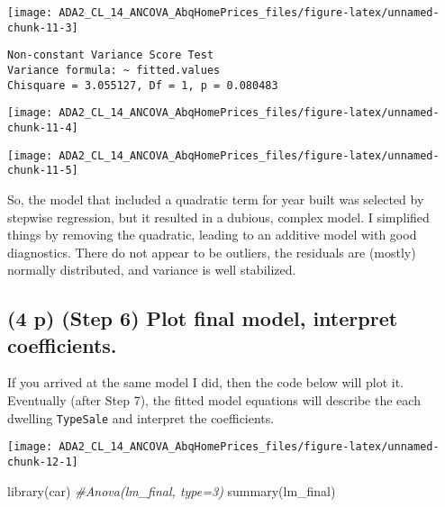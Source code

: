 \documentclass[
  12pt,
]{article}
\newenvironment{Shaded}{\begin{snugshade}}{\end{snugshade}}
\newcommand{\CommentTok}[1]{\textcolor[rgb]{0.56,0.35,0.01}{\textit{#1}}}
\newcommand{\FunctionTok}[1]{\textcolor[rgb]{0.00,0.00,0.00}{#1}}
\newcommand{\NormalTok}[1]{#1}
\begin{document}
\begin{center}\texttt{[image: ADA2\_CL\_14\_ANCOVA\_AbqHomePrices\_files/figure-latex/unnamed-chunk-11-3]} \end{center}

\begin{verbatim}
Non-constant Variance Score Test 
Variance formula: ~ fitted.values 
Chisquare = 3.055127, Df = 1, p = 0.080483
\end{verbatim}

\begin{center}\texttt{[image: ADA2\_CL\_14\_ANCOVA\_AbqHomePrices\_files/figure-latex/unnamed-chunk-11-4]} \end{center}

\begin{center}\texttt{[image: ADA2\_CL\_14\_ANCOVA\_AbqHomePrices\_files/figure-latex/unnamed-chunk-11-5]} \end{center}

So, the model that included a quadratic term for year built was selected
by stepwise regression, but it resulted in a dubious, complex model. I
simplified things by removing the quadratic, leading to an additive
model with good diagnostics. There do not appear to be outliers, the
residuals are (mostly) normally distributed, and variance is well
stabilized.

\hypertarget{p-step-6-plot-final-model-interpret-coefficients.}{%
\subsection{\texorpdfstring{\textbf{(4 p)} (Step 6) Plot final model,
interpret
coefficients.}{(4 p) (Step 6) Plot final model, interpret coefficients.}}\label{p-step-6-plot-final-model-interpret-coefficients.}}

If you arrived at the same model I did, then the code below will plot
it. Eventually (after Step 7), the fitted model equations will describe
the each dwelling \texttt{TypeSale} and interpret the coefficients.

\begin{center}\texttt{[image: ADA2\_CL\_14\_ANCOVA\_AbqHomePrices\_files/figure-latex/unnamed-chunk-12-1]} \end{center}

\begin{Shaded}
\begin{Highlighting}[]
\FunctionTok{library}\NormalTok{(car)}
\CommentTok{\#Anova(lm\_final, type=3)}
\FunctionTok{summary}\NormalTok{(lm\_final)}
\end{Highlighting}
\end{Shaded}
\end{document}
